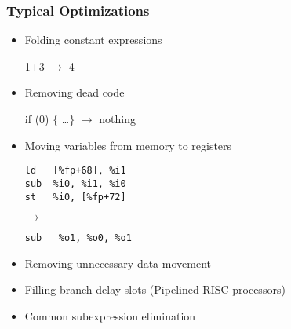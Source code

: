 \documentclass{plt}
\begin{document}
\begin{frame}[fragile=singleslide]
  \frametitle{Typical Optimizations}

\begin{itemize}

\item Folding constant expressions

1+3 $\rightarrow$ 4

\item Removing dead code

if (0) $\{$ \ldots $\}$ $\rightarrow$ nothing

\item Moving variables from memory to registers

\medskip

\begin{minipage}{0.35\textwidth}
\begin{verbatim}
ld   [%fp+68], %i1
sub  %i0, %i1, %i0
st   %i0, [%fp+72]
\end{verbatim}
\end{minipage}
$\rightarrow$ 
\begin{minipage}{0.4\textwidth}
\begin{verbatim}
sub   %o1, %o0, %o1
\end{verbatim}
\end{minipage}

\medskip

\item Removing unnecessary data movement

\item Filling branch delay slots (Pipelined RISC processors)

\item Common subexpression elimination

\end{itemize}

\end{frame}
\end{document}

